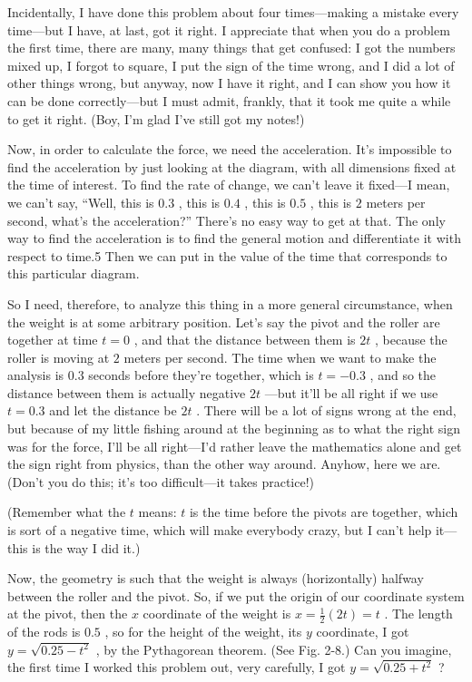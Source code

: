 \documentclass[11pt,oneside]{article}
\begin{document}
Incidentally, I have done this problem about four times---making a mistake every time---but I have, at last, got it right. I appreciate that when you do a problem the first time, there are many, many things that get confused: I got the numbers mixed up, I forgot to square, I put the sign of the time wrong, and I did a lot of other things wrong, but anyway, now I have it right, and I can show you how it can be done correctly---but I must admit, frankly, that it took me quite a while to get it right. (Boy, I'm glad I've still got my notes!)\par

Now, in order to calculate the force, we need the acceleration. It's impossible to find the acceleration by just looking at the diagram, with all dimensions fixed at the time of interest. To find the rate of change, we can't leave it fixed---I mean, we can't say, ``Well, this is \(0.3\) , this is \(0.4\) , this is \(0.5\) , this is \(2\) meters per second, what's the acceleration?'' There's no easy way to get at that. The only way to find the acceleration is to find the general motion and differentiate it with respect to time.5 Then we can put in the value of the time that corresponds to this particular diagram.\par

So I need, therefore, to analyze this thing in a more general circumstance, when the weight is at some arbitrary position. Let's say the pivot and the roller are together at time \(t=0\) , and that the distance between them is \(2t\) , because the roller is moving at \(2\) meters per second. The time when we want to make the analysis is \(0.3\) seconds before they're together, which is \(t=-0.3\) , and so the distance between them is actually negative \(2t\) ---but it'll be all right if we use \(t=0.3\) and let the distance be \(2t\) . There will be a lot of signs wrong at the end, but because of my little fishing around at the beginning as to what the right sign was for the force, I'll be all right---I'd rather leave the mathematics alone and get the sign right from physics, than the other way around. Anyhow, here we are. (Don't you do this; it's too difficult---it takes practice!)\par

(Remember what the \(t\) means: \(t\) is the time before the pivots are together, which is sort of a negative time, which will make everybody crazy, but I can't help it---this is the way I did it.)\par

Now, the geometry is such that the weight is always (horizontally) halfway between the roller and the pivot. So, if we put the origin of our coordinate system at the pivot, then the \(x\) coordinate of the weight is \(x=\frac12(2t)=t\) . The length of the rods is \(0.5\) , so for the height of the weight, its \(y\) coordinate, I got \(y=\sqrt{0.25-t^2}\) , by the Pythagorean theorem. (See Fig. 2-8.) Can you imagine, the first time I worked this problem out, very carefully, I got \(y=\sqrt{0.25+t^2}\) ?\par
\end{document}
